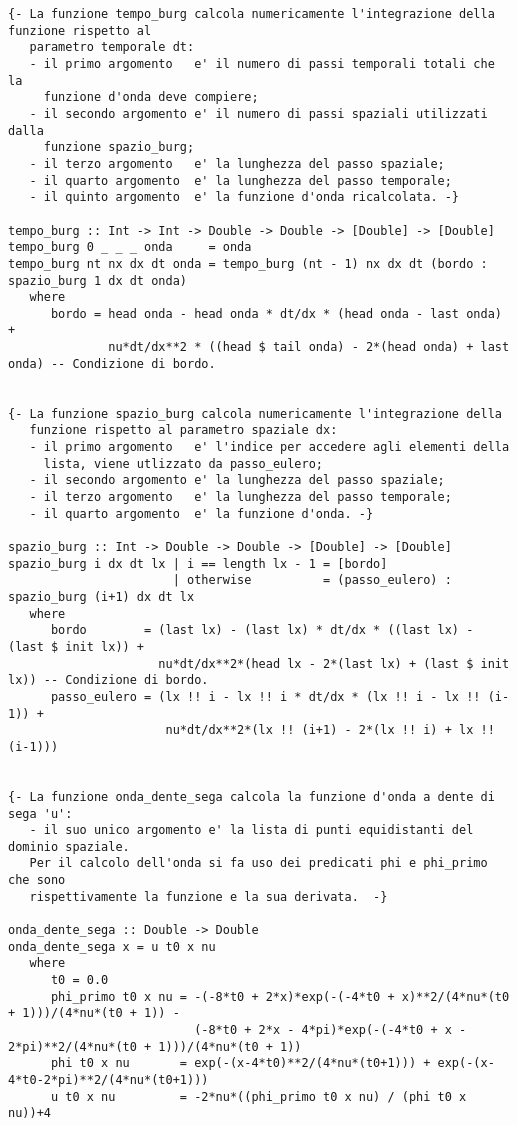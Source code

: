 \begin{verbatim}
{- La funzione tempo_burg calcola numericamente l'integrazione della funzione rispetto al 
   parametro temporale dt:
   - il primo argomento   e' il numero di passi temporali totali che la
     funzione d'onda deve compiere; 
   - il secondo argomento e' il numero di passi spaziali utilizzati dalla
     funzione spazio_burg;       
   - il terzo argomento   e' la lunghezza del passo spaziale;
   - il quarto argomento  e' la lunghezza del passo temporale;
   - il quinto argomento  e' la funzione d'onda ricalcolata. -}

tempo_burg :: Int -> Int -> Double -> Double -> [Double] -> [Double]
tempo_burg 0 _ _ _ onda     = onda
tempo_burg nt nx dx dt onda = tempo_burg (nt - 1) nx dx dt (bordo : spazio_burg 1 dx dt onda)
   where
      bordo = head onda - head onda * dt/dx * (head onda - last onda) +
              nu*dt/dx**2 * ((head $ tail onda) - 2*(head onda) + last onda) -- Condizione di bordo.


{- La funzione spazio_burg calcola numericamente l'integrazione della
   funzione rispetto al parametro spaziale dx:
   - il primo argomento   e' l'indice per accedere agli elementi della 
     lista, viene utlizzato da passo_eulero; 
   - il secondo argomento e' la lunghezza del passo spaziale;
   - il terzo argomento   e' la lunghezza del passo temporale;
   - il quarto argomento  e' la funzione d'onda. -}

spazio_burg :: Int -> Double -> Double -> [Double] -> [Double]
spazio_burg i dx dt lx | i == length lx - 1 = [bordo]
                       | otherwise          = (passo_eulero) : spazio_burg (i+1) dx dt lx
   where
      bordo        = (last lx) - (last lx) * dt/dx * ((last lx) - (last $ init lx)) +
                     nu*dt/dx**2*(head lx - 2*(last lx) + (last $ init lx)) -- Condizione di bordo.
      passo_eulero = (lx !! i - lx !! i * dt/dx * (lx !! i - lx !! (i-1)) + 
                      nu*dt/dx**2*(lx !! (i+1) - 2*(lx !! i) + lx !! (i-1)))


{- La funzione onda_dente_sega calcola la funzione d'onda a dente di sega 'u':
   - il suo unico argomento e' la lista di punti equidistanti del dominio spaziale. 
   Per il calcolo dell'onda si fa uso dei predicati phi e phi_primo che sono 
   rispettivamente la funzione e la sua derivata.  -}

onda_dente_sega :: Double -> Double
onda_dente_sega x = u t0 x nu
   where
      t0 = 0.0                                                                              
      phi_primo t0 x nu = -(-8*t0 + 2*x)*exp(-(-4*t0 + x)**2/(4*nu*(t0 + 1)))/(4*nu*(t0 + 1)) - 
                          (-8*t0 + 2*x - 4*pi)*exp(-(-4*t0 + x - 2*pi)**2/(4*nu*(t0 + 1)))/(4*nu*(t0 + 1))       
      phi t0 x nu       = exp(-(x-4*t0)**2/(4*nu*(t0+1))) + exp(-(x-4*t0-2*pi)**2/(4*nu*(t0+1)))
      u t0 x nu         = -2*nu*((phi_primo t0 x nu) / (phi t0 x nu))+4



\end{verbatim}
